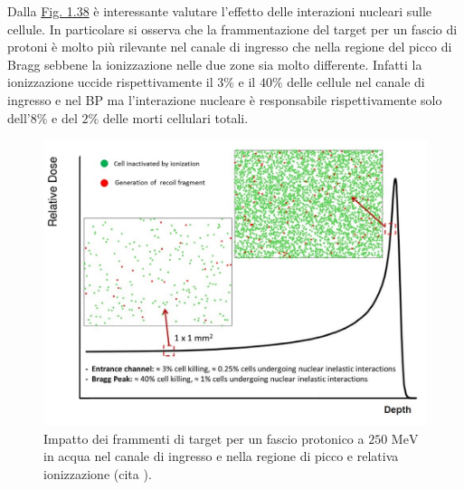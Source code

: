 \documentclass[12pt,a4paper,twoside]{report}
\begin{document}
	 Dalla \hyperref[fig:biol_effect_nuclear]{Fig. 1.38} è interessante valutare l'effetto delle interazioni nucleari sulle cellule. In particolare si osserva che la frammentazione del target per un fascio di protoni è molto più rilevante nel canale di ingresso che nella regione del picco di Bragg sebbene la ionizzazione nelle due zone sia molto differente. Infatti la ionizzazione uccide rispettivamente il $3\%$ e il $40\%$ delle cellule nel canale di ingresso e nel BP ma l'interazione nucleare è responsabile rispettivamente solo dell'$8\%$ e del $2\%$ delle morti cellulari totali.
	 
	 \begin{figure}[H]
	 	\centering
	 	\includegraphics[width=0.9\linewidth]{biol_effect_nuclear.jpg}
	 	\caption{Impatto dei frammenti di target per un fascio protonico a $250\mbox{ MeV}$ in acqua nel canale di ingresso e nella regione di picco e relativa ionizzazione (cita
	 		).}
	 	\label{fig:biol_effect_nuclear}
	 \end{figure}
		
\end{document}
